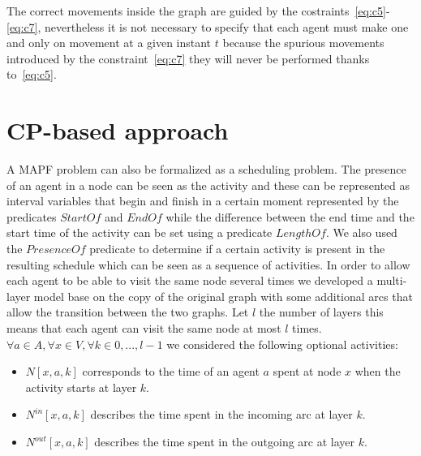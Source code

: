 \documentclass[12pt, a4paper, hidelinks]{article}
\numberwithin{equation}{section}
\begin{document}
The correct movements inside the graph are guided by the costraints~\ref{eq:c5}-\ref{eq:c7}, nevertheless it is not necessary to specify that each agent must make one and only on movement at a given instant $t$ because the spurious movements introduced by the constraint~\ref{eq:c7} they will never be performed thanks to~\ref{eq:c5}.

\section{CP-based approach}\label{sec:cp-based-approach}

A MAPF problem can also be formalized as a scheduling problem.
The presence of an agent in a node can be seen as the activity and these can be represented as interval variables that begin and finish in a certain moment represented by the predicates $StartOf$ and $EndOf$ while the difference between the end time and the start time of the activity can be set using a predicate $LengthOf$.
We also used the $PresenceOf$ predicate to determine if a certain activity is present in the resulting schedule which can be seen as a sequence of activities.
In order to allow each agent to be able to visit the same node several times we developed a multi-layer model  base on the copy of the original graph with some additional arcs that allow the transition between the two graphs.
Let $l$ the number of layers this means that each agent can visit the same node at most $l$ times.
$\forall a \in A, \forall x \in V, \forall k \in {0,...,l-1}$ we considered the following optional activities:

\begin{itemize}
\item $N[x,a,k]$ corresponds to the time of an agent $a$ spent at node $x$ when the activity starts at layer $k$.
\item $N^{in}[x,a,k]$ describes the time spent in the incoming arc at layer $k$.
\item $N^{out}[x,a,k]$ describes the time spent in the outgoing arc at layer $k$.
\end{itemize}
\end{document}
